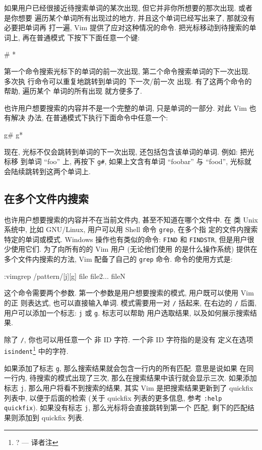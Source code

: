 如果用户已经很接近待搜索单词的某次出现, 但它并非你所想要的那次出现. 或者是你想要
遍历某个单词所有出现过的地方, 并且这个单词已经写出来了, 那就没有必要把单词再
打一遍, Vim 提供了应对这种情况的命令. 把光标移动到待搜索的单词上, 再在普通模式
下按下下面任意一个键:
\begin{vimcode}
#
*
\end{vimcode}
第一个命令搜索光标下的单词的前一次出现, 第二个命令搜索单词的下一次出现. 多次执
行命令可以重复地跳转到单词的 下一次/前一次 出现. 有了这两个命令的帮助, 遍历某个
单词的所有出现 就方便多了.

也许用户想要搜索的内容并不是一个完整的单词, 只是单词的一部分. 对此 Vim 也有解决
办法, 在普通模式下执行下面命令中任意一个:
\begin{vimcode}
g#
g*
\end{vimcode}
现在, 光标不仅会跳转到单词的下一次出现, 还包括包含该单词的单词. 例如: 把光标移
到单词 ``foo'' 上, 再按下 \texttt{g\#}, 如果上文含有单词 ``foobar'' 与 ``food'',
光标就会陆续跳转到这两个单词上.

\subsection{在多个文件内搜索}
\label{subsec:search_in_multiple_files}

也许用户想要搜索的内容并不在当前文件内, 甚至不知道在哪个文件中. 在
类 Unix 系统中, 比如 GNU/Linux, 用户可以用 Shell 命令 \texttt{grep}, 在多个指
定的文件内搜索特定的单词或模式. Windows 操作也有类似的命令: \texttt{FIND} 和
\texttt{FINDSTR}, 但是用户很少使用它们. 为了向所有的的 Vim 用户 (无论他们使用
的是什么操作系统) 提供在多个文件内搜索的方法, Vim 配备了自己的 \texttt{grep}
命令. 命令的使用方式是:
\begin{vimcode}
:vimgrep /pattern/[j][g] file file2... fileN
\end{vimcode}
这个命令需要两个参数. 第一个参数是用户想要搜索的模式, 用户既可以使用 Vim 的正
则表达式, 也可以直接输入单词. 模式需要用一对 \texttt{/} 括起来, 在右边的
\texttt{/} 后面, 用户可以添加一个标志: \texttt{j} 或 \texttt{g}. 标志可以帮助
用户选取结果, 以及如何展示搜索结果.
\begin{warning}
    除了 \texttt{/}, 你也可以用任意一个 非 ID 字符. 一个非 ID 字符指的是没有
    定义在选项 \texttt{isindent}\footnote{? --- 译者注} 中的字符.
\end{warning}

如果添加了标志 \texttt{g}, 那么搜索结果就会包含一行内的所有匹配. 意思是说如果
在同一行内, 待搜索的模式出现了三次, 那么在搜索结果中该行就会显示三次. 如果添加
标志 \texttt{j}, 那么用户将看不到搜索的结果, 其实 Vim 是把搜索结果更新到了
quickfix 列表中, 以便于后面的检索 (关于 quickfix 列表的更多信息, 参考
\texttt{:help quickfix}). 如果没有标志 \texttt{j}, 那么光标将会直接跳转到第一个
匹配, 剩下的匹配结果则添加到 quickfix 列表.

